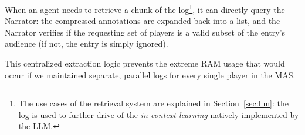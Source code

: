 When an agent needs to retrieve a chunk of the log\footnote{The use cases of the retrieval system are explained in Section~\ref{sec:llm}: the log is used to further drive of the \emph{in-context learning} natively implemented by the LLM.}, it can directly query the Narrator: the compressed annotations are expanded back into a list, and the Narrator verifies if the requesting set of players is a valid subset of the entry's audience (if not, the entry is simply ignored). 

This centralized extraction logic prevents the extreme RAM usage that would occur if we maintained separate, parallel logs for every single player in the MAS.